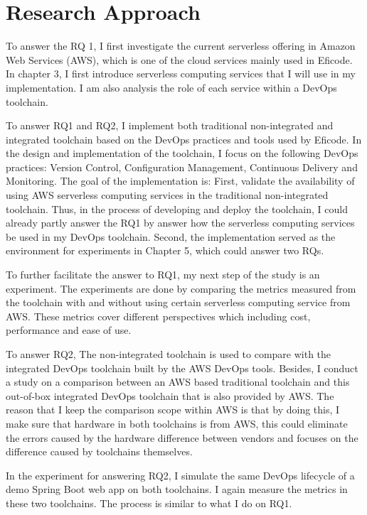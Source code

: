 \section{Research Approach} 
\par
To answer the RQ 1, I first investigate the current serverless offering in Amazon Web Services (AWS), which is one of the cloud services mainly used in Eficode. In chapter 3, I first introduce serverless computing services that I will use in my implementation. I am also analysis the role of each service within a DevOps toolchain.
\par
To answer RQ1 and RQ2, I implement both traditional non-integrated and integrated toolchain based on the DevOps practices and tools used by Eficode. In the design and implementation of the toolchain, I focus on the following DevOps practices: Version Control, Configuration Management, Continuous Delivery and Monitoring. The goal of the implementation is: First, validate the availability of using AWS serverless computing services in the traditional non-integrated toolchain. Thus, in the process of developing and deploy the toolchain, I could already partly answer the RQ1 by answer how the serverless computing services be used in my DevOps toolchain. Second, the implementation served as the environment for experiments in Chapter 5, which could answer two RQs.
\par
To further facilitate the answer to RQ1, my next step of the study is an experiment.
The experiments are done by comparing the metrics measured from the toolchain with and without using certain serverless computing service from AWS. These metrics cover different perspectives which including cost, performance and ease of use. 
\par
To answer RQ2, The non-integrated toolchain is used to compare with the integrated DevOps toolchain built by the AWS DevOps tools.
Besides, I conduct a study on a comparison between an AWS based traditional toolchain and this out-of-box integrated DevOps toolchain that is also provided by AWS. The reason that I keep the comparison scope within AWS is that by doing this, I make sure that hardware in both toolchains is from AWS, this could eliminate the errors caused by the hardware difference between vendors and focuses on the difference caused by toolchains themselves.
\par
In the experiment for answering RQ2, I simulate the same DevOps lifecycle of a demo Spring Boot web app on both toolchains. I again measure the metrics in these two toolchains. The process is similar to what I do on RQ1.
